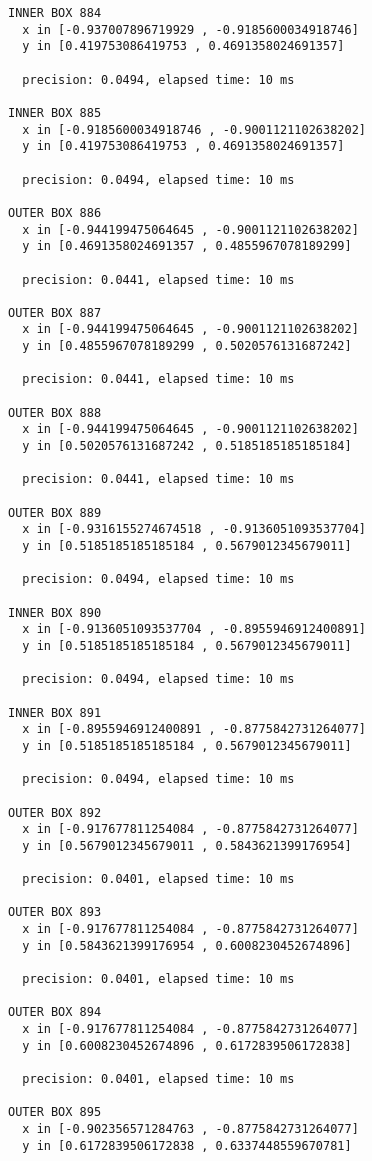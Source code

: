 \begin{verbatim}
INNER BOX 884
  x in [-0.937007896719929 , -0.9185600034918746]
  y in [0.419753086419753 , 0.4691358024691357]

  precision: 0.0494, elapsed time: 10 ms

INNER BOX 885
  x in [-0.9185600034918746 , -0.9001121102638202]
  y in [0.419753086419753 , 0.4691358024691357]

  precision: 0.0494, elapsed time: 10 ms

OUTER BOX 886
  x in [-0.944199475064645 , -0.9001121102638202]
  y in [0.4691358024691357 , 0.4855967078189299]

  precision: 0.0441, elapsed time: 10 ms

OUTER BOX 887
  x in [-0.944199475064645 , -0.9001121102638202]
  y in [0.4855967078189299 , 0.5020576131687242]

  precision: 0.0441, elapsed time: 10 ms

OUTER BOX 888
  x in [-0.944199475064645 , -0.9001121102638202]
  y in [0.5020576131687242 , 0.5185185185185184]

  precision: 0.0441, elapsed time: 10 ms

OUTER BOX 889
  x in [-0.9316155274674518 , -0.9136051093537704]
  y in [0.5185185185185184 , 0.5679012345679011]

  precision: 0.0494, elapsed time: 10 ms

INNER BOX 890
  x in [-0.9136051093537704 , -0.8955946912400891]
  y in [0.5185185185185184 , 0.5679012345679011]

  precision: 0.0494, elapsed time: 10 ms

INNER BOX 891
  x in [-0.8955946912400891 , -0.8775842731264077]
  y in [0.5185185185185184 , 0.5679012345679011]

  precision: 0.0494, elapsed time: 10 ms

OUTER BOX 892
  x in [-0.917677811254084 , -0.8775842731264077]
  y in [0.5679012345679011 , 0.5843621399176954]

  precision: 0.0401, elapsed time: 10 ms

OUTER BOX 893
  x in [-0.917677811254084 , -0.8775842731264077]
  y in [0.5843621399176954 , 0.6008230452674896]

  precision: 0.0401, elapsed time: 10 ms

OUTER BOX 894
  x in [-0.917677811254084 , -0.8775842731264077]
  y in [0.6008230452674896 , 0.6172839506172838]

  precision: 0.0401, elapsed time: 10 ms

OUTER BOX 895
  x in [-0.902356571284763 , -0.8775842731264077]
  y in [0.6172839506172838 , 0.6337448559670781]


\end{verbatim}
